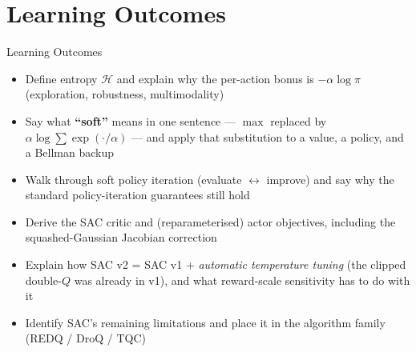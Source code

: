 \section{Learning Outcomes}
\begin{frame}{Learning Outcomes}
    \begin{itemize}
        \setlength{\itemsep}{0.5em}
        \item Define entropy $\mathcal{H}$ and explain why the per-action bonus is $-\alpha\log\pi$ (exploration, robustness, multimodality)
        \item Say what \textbf{``soft''} means in one sentence --- $\max$ replaced by $\alpha\log\sum\exp(\cdot/\alpha)$ --- and apply that substitution to a value, a policy, and a Bellman backup
        \item Walk through soft policy iteration (evaluate $\leftrightarrow$ improve) and say why the standard policy-iteration guarantees still hold
        \item Derive the SAC critic and (reparameterised) actor objectives, including the squashed-Gaussian Jacobian correction
        \item Explain how SAC v2 = SAC v1 + \emph{automatic temperature tuning} (the clipped double-$Q$ was already in v1), and what reward-scale sensitivity has to do with it
        \item Identify SAC's remaining limitations and place it in the algorithm family (REDQ / DroQ / TQC)
    \end{itemize}
\end{frame}
